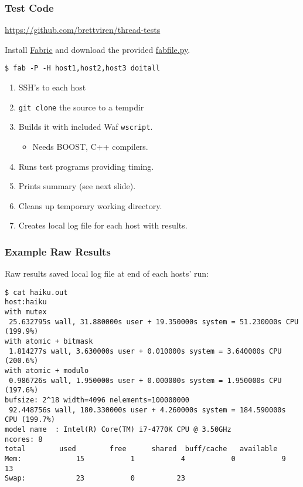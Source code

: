 \documentclass{beamer}
\begin{document}
\begin{frame}
  \frametitle{Test Code}
  \begin{center}
    \url{https://github.com/brettviren/thread-tests}
  \end{center}
Install \href{http://www.fabfile.org/}{Fabric} and download the provided \href{https://raw.githubusercontent.com/brettviren/thread-tests/master/fabfile.py}{fabfile.py}.
\begin{verbatim}
$ fab -P -H host1,host2,host3 doitall
\end{verbatim}

\begin{enumerate}
\item SSH's to each host
\item \texttt{git clone} the source to a tempdir
\item Builds it with included Waf \texttt{wscript}.
  \begin{itemize}
  \item Needs BOOST, C++ compilers.
  \end{itemize}
\item Runs test programs providing timing.
\item Prints summary (see next slide).
\item Cleans up temporary working directory.
\item Creates local log file for each host with results.
\end{enumerate}
\end{frame}

\begin{frame}[fragile]
  \frametitle{Example Raw Results}
  
Raw results saved local log file at end of each hosts' run:
\tiny
\begin{verbatim}
$ cat haiku.out
host:haiku
with mutex
 25.632795s wall, 31.880000s user + 19.350000s system = 51.230000s CPU (199.9%)
with atomic + bitmask
 1.814277s wall, 3.630000s user + 0.010000s system = 3.640000s CPU (200.6%)
with atomic + modulo
 0.986726s wall, 1.950000s user + 0.000000s system = 1.950000s CPU (197.6%)
bufsize: 2^18 width=4096 nelements=100000000
 92.448756s wall, 180.330000s user + 4.260000s system = 184.590000s CPU (199.7%)
model name	: Intel(R) Core(TM) i7-4770K CPU @ 3.50GHz
ncores: 8
total        used        free      shared  buff/cache   available
Mem:             15           1           4           0           9          13
Swap:            23           0          23
\end{verbatim}
\end{frame}
\end{document}
